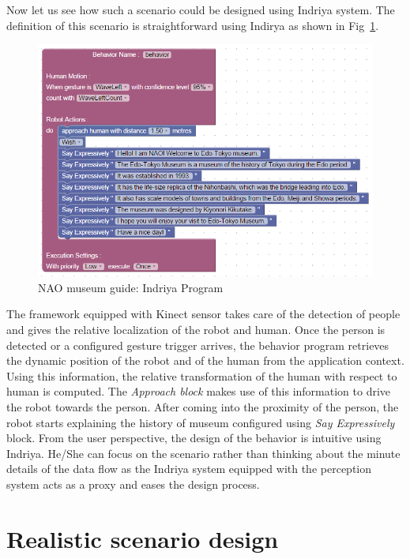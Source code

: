 Now let us see how such a scenario could be designed using Indriya system. The definition of this scenario is straightforward using Indirya as shown in Fig~\ref{fig:scenario1_program}.

\begin{figure}[H]
\centering
\includegraphics[width=\textwidth]{../thesis/assets/scenario1.png}
\caption[NAO museum guide: Indriya Program]{NAO museum guide: Indriya Program}
\label{fig:scenario1_program}
\end{figure}
		
The framework equipped with Kinect sensor takes care of the detection of people and gives the relative localization of the robot and human. Once the person is detected or a configured gesture trigger arrives, the behavior program retrieves the dynamic position of the robot and of the human from the application context. Using this information, the relative transformation of the human with respect to human is computed. The \emph{Approach block} makes use of this information to drive the robot towards the person. After coming into the proximity of the person, the robot starts explaining the history of museum configured using \emph{Say Expressively} block. From the user perspective, the design of the behavior is intuitive using Indriya. He/She can focus on the scenario rather than thinking about the minute details of the data flow as the Indriya system equipped with the perception system acts as a proxy and eases the design process.

\section{Realistic scenario design}

